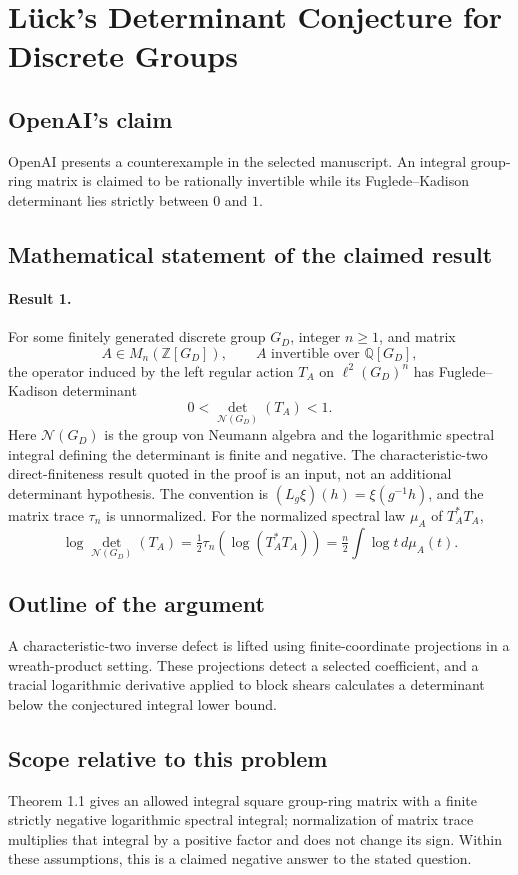 \documentclass[11pt]{article}
\begin{document}
\section*{Lück's Determinant Conjecture for Discrete Groups}

\subsection{OpenAI's claim}
OpenAI presents a counterexample in the selected manuscript. An integral group-ring matrix is claimed to be rationally invertible while its Fuglede--Kadison determinant lies strictly between $0$ and $1$.

\subsection{Mathematical statement of the claimed result}
\paragraph{Result 1.} For some finitely generated discrete group \(G_D\), integer \(n\ge1\), and matrix
\[
 A\in M_n(\mathbb Z[G_D]),\qquad A\text{ invertible over }\mathbb Q[G_D],
\]
the operator induced by the left regular action \(T_A\) on \(\ell^2(G_D)^n\) has Fuglede--Kadison determinant
\[
 0<\det_{\mathcal N(G_D)}(T_A)<1.
\]
Here \(\mathcal N(G_D)\) is the group von Neumann algebra and the logarithmic spectral integral defining the determinant is finite and negative. The characteristic-two direct-finiteness result quoted in the proof is an input, not an additional determinant hypothesis. The convention is $(L_g\xi)(h)=\xi(g^{-1}h)$, and the matrix trace $\tau_n$ is unnormalized. For the normalized spectral law $\mu_A$ of $T_A^*T_A$,
\[
 \log\det_{\mathcal N(G_D)}(T_A)=\tfrac12\tau_n(\log(T_A^*T_A))=\tfrac n2\int\log t\,d\mu_A(t).
\]

\subsection{Outline of the argument}
A characteristic-two inverse defect is lifted using finite-coordinate projections in a wreath-product setting. These projections detect a selected coefficient, and a tracial logarithmic derivative applied to block shears calculates a determinant below the conjectured integral lower bound.

\subsection{Scope relative to this problem}
Theorem 1.1 gives an allowed integral square group-ring matrix with a finite strictly negative logarithmic spectral integral; normalization of matrix trace multiplies that integral by a positive factor and does not change its sign. Within these assumptions, this is a claimed negative answer to the stated question.
\end{document}
